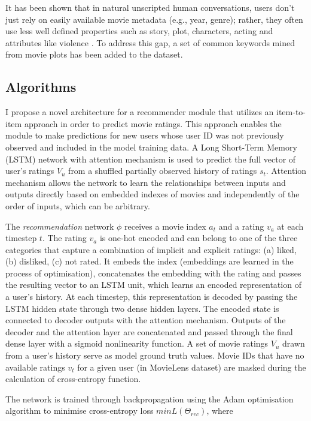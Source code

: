 It has been shown that in natural unscripted human conversations, users don’t just rely on easily available movie metadata (e.g., year, genre); rather, they often use less well defined properties such as story, plot, characters, acting and attributes like violence \citep{radlinski2019coached}. To address this gap, a set of common keywords mined from movie plots has been added to the dataset.


\subsection{Algorithms} %

I propose a novel architecture for a recommender module that utilizes an item-to-item approach in order to predict movie ratings. This approach enables the module to make predictions for new users whose user ID was not previously observed and included in the model training data. A Long Short-Term Memory (LSTM) network with attention mechanism is used to predict the full vector of user’s ratings $V_u$ from a shuffled partially observed history of ratings $s_t$. Attention mechanism allows the network to learn the relationships between inputs and outputs directly based on embedded indexes of movies and independently of the order of inputs, which can be arbitrary. 

The \textit{recommendation} network $\phi$ receives a movie index $a_t$ and a rating $v_a$ at each timestep $t$. The rating $v_a$ is one-hot encoded and can belong to one of the three categories that capture a combination of implicit and explicit ratings: (a) liked, (b) disliked, (c) not rated. It embeds the index (embeddings are learned in the process of optimisation), concatenates the embedding with the rating and passes the resulting vector to an LSTM unit, which learns an encoded representation of a user’s history. At each timestep, this representation is decoded by passing the LSTM hidden state through two dense hidden layers. The encoded state is connected to decoder outputs with the attention mechanism. Outputs of the decoder and the attention layer are concatenated and passed through the final dense layer with a sigmoid nonlinearity function. A set of movie ratings $V_u$ drawn from a user’s history serve as model ground truth values. Movie IDs that have no available ratings $v_t$ for a given user (in MovieLens dataset) are masked during the calculation of cross-entropy function. 

The network is trained through backpropagation using the Adam optimisation algorithm to minimise cross-entropy loss $minL(\Theta_{rec})$, where

